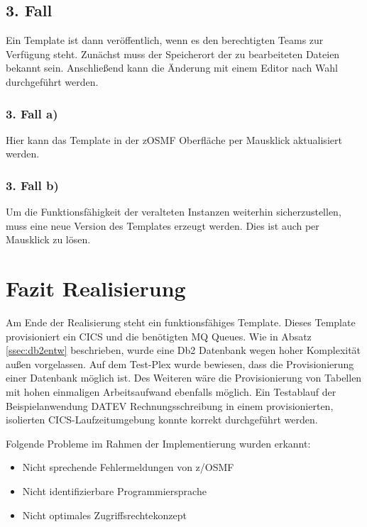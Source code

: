 \subsection{3. Fall}
Ein Template ist dann veröffentlich, wenn es den berechtigten Teams zur Verfügung steht.
Zunächst muss der Speicherort der zu bearbeiteten Dateien bekannt sein.
Anschließend kann die Änderung mit einem Editor nach Wahl durchgeführt werden.

\subsubsection{3. Fall a)}
Hier kann das Template in der zOSMF Oberfläche per Mausklick aktualisiert werden.

\subsubsection{3. Fall b)}
Um die Funktionsfähigkeit der veralteten Instanzen weiterhin sicherzustellen, muss eine neue Version des Templates erzeugt werden.
Dies ist auch per Mausklick zu lösen.

\section{Fazit Realisierung}
Am Ende der Realisierung steht ein funktionsfähiges Template.
Dieses Template provisioniert ein CICS und die benötigten MQ Queues.
Wie in Absatz \ref{ssec:db2entw} beschrieben, wurde eine Db2 Datenbank wegen hoher Komplexität außen vorgelassen.
Auf dem Test-Plex wurde bewiesen, dass die Provisionierung einer Datenbank möglich ist.
Des Weiteren wäre die Provisionierung von Tabellen mit hohen einmaligen Arbeitsaufwand ebenfalls möglich.
Ein Testablauf der Beispielanwendung DATEV Rechnungsschreibung in einem provisionierten, isolierten CICS-Laufzeitumgebung konnte korrekt durchgeführt werden.

Folgende Probleme im Rahmen der Implementierung wurden erkannt:

\begin{samepage}
\begin{itemize}
\item Nicht sprechende Fehlermeldungen von z/OSMF
\item Nicht identifizierbare Programmiersprache
\item Nicht optimales Zugriffsrechtekonzept
\end{itemize}
\end{samepage}

